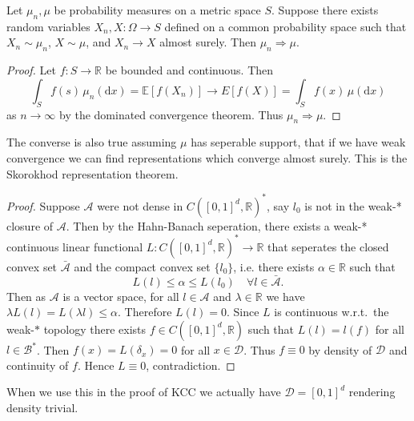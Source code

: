 \documentclass[fontsize=12pt, DIV=10]{scrreprt}
\theoremstyle{remark}
\newcommand{\R}{\mathbb R}
\newcommand{\E}{\mathbb E}
\newcommand{\calA}{\mathcal A}
\newcommand{\calB}{\mathcal B}
\newcommand{\calD}{\mathcal D}
\newcommand{\dif}[1]{\text{d} #1}
\newcommand{\towk}{\Rightarrow}
\newcommand{\unitbox}{\ensuremath{[0,1]^d}}
\begin{document}
\begin{prop}
	Let $\mu_n, \mu$ be probability measures on a metric space $S$. Suppose there exists random variables $X_n, X: \Omega \to S$ defined on a common probability space such that $X_n \sim \mu_n$, $X \sim \mu$, and $X_n \to X$ almost surely. Then $\mu_n \towk \mu$.
\end{prop}
\begin{proof}
	Let $f: S \to \R$ be bounded and continuous. Then
	\begin{equation}
		\int_S f(s) \, \mu_n(\dif x)
		= \E[f(X_n)] \to E[f(X)] = \int_S f(x) \, \mu(\dif x)
	\end{equation}
	as $n \to \infty$ by the dominated convergence theorem. Thus $\mu_n \towk \mu$.
\end{proof}

The converse is also true assuming $\mu$ has seperable support, that if we have weak convergence we can find representations which converge almost surely. This is the Skorokhod representation theorem.

\dirac*

\begin{proof}
	Suppose $\calA$ were not dense in $C(\unitbox, \R)^*$, say $l_0$ is not in the weak-* closure of $\calA$. Then by the Hahn-Banach seperation, there exists a weak-* continuous linear functional $L: C(\unitbox, \R)^* \to \R$ that seperates the closed convex set $\bar{\calA}$ and the compact convex set $\{l_0\}$, i.e. there exists $\alpha \in \R$ such that
	\begin{equation}
		L(l) \leq \alpha \leq L(l_0) \quad \forall l \in \bar{\calA}.
	\end{equation}
	Then as $\calA$ is a vector space, for all $l \in \calA$ and $\lambda \in \R$ we have $\lambda L(l) = L(\lambda l) \leq \alpha$. Therefore $L(l) = 0$. Since $L$ is continuous w.r.t.\ the weak-$*$ topology there exists $f \in C(\unitbox, \R)$ such that $L(l) = l(f)$ for all $l \in \calB^*$. Then $f(x) = L(\delta_x) = 0$ for all $x \in \calD$. Thus $f \equiv 0$ by density of $\calD$ and continuity of $f$. Hence $L \equiv 0$, contradiction.
\end{proof}

When we use this in the proof of KCC we actually have $\calD = \unitbox$ rendering density trivial.
\end{document}
